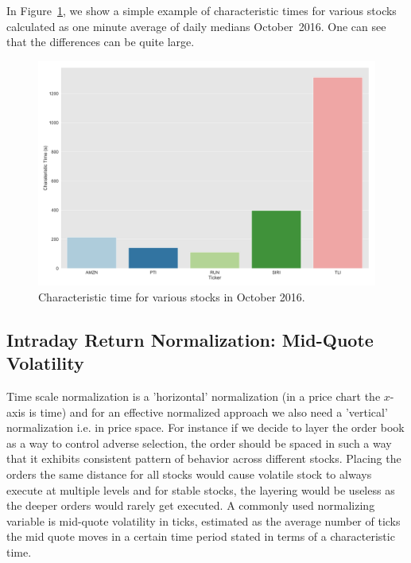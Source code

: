 In Figure~\ref{fig:char_time}, we show a simple example of characteristic times for various stocks calculated as one minute average of daily medians October~2016. One can see that the differences can be quite large.

	\begin{figure}[!ht]
	\centering
	\includegraphics[width=\textwidth]{chapters/chapter_trade_data_models/figures/char_time.png} 
	\caption{Characteristic time for various stocks in October 2016.\label{fig:char_time}}
	\end{figure}


\subsection{Intraday Return Normalization: Mid-Quote Volatility\label{sec:intra_norm_return_mid}}

Time scale normalization is a 'horizontal' normalization (in a price chart the $x$-axis is time) and for an effective normalized approach we also need a 'vertical' normalization i.e. in price space. For instance if we decide to layer the order book as a way to control adverse selection, the order should be spaced in such a way that it exhibits consistent pattern of behavior across different stocks. Placing the orders the same distance for all stocks would cause volatile stock to always execute at multiple levels and for stable stocks, the layering would be useless as the deeper orders would rarely get executed. A commonly used normalizing variable is mid-quote volatility in ticks, estimated as the average number of ticks the mid quote moves in a certain time period stated in terms of a characteristic time. 


